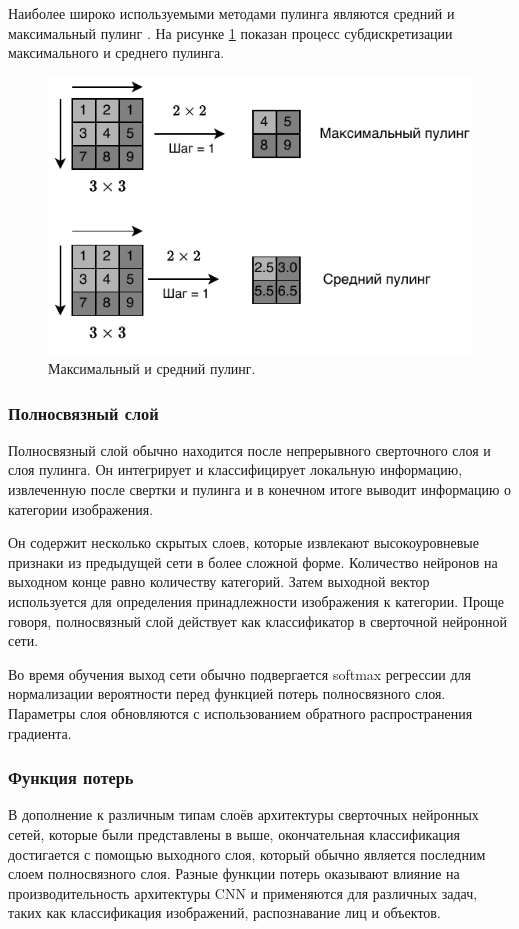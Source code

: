 Наиболее широко используемыми методами пулинга являются средний и максимальный пулинг \cite{pooling-layer-4}.
На рисунке \ref{fig:pooling-layer} показан процесс субдискретизации максимального и среднего пулинга.

\begin{figure}[hbtp]
	\centering
	\includegraphics[width=\textwidth]{img/pooling.pdf}
	\caption{Максимальный и средний пулинг.}
	\label{fig:pooling-layer}
\end{figure}

\clearpage


\subsubsection{Полносвязный слой}
Полносвязный  слой обычно находится после непрерывного сверточного слоя и слоя пулинга. Он интегрирует и классифицирует локальную информацию, извлеченную после свертки и пулинга и в конечном итоге выводит информацию о категории изображения. 

Он содержит несколько скрытых слоев, которые извлекают высокоуровневые признаки из предыдущей сети в более сложной форме. Количество нейронов на выходном конце равно количеству категорий. Затем выходной вектор используется для определения принадлежности изображения к категории. Проще говоря, полносвязный слой действует как классификатор в сверточной нейронной сети.

Во время обучения  выход сети обычно подвергается softmax регрессии\cite{pooling-layer-1} для нормализации вероятности перед функцией потерь полносвязного слоя. Параметры слоя обновляются с использованием обратного распространения градиента.

\subsubsection{Функция потерь}
В дополнение к различным типам слоёв архитектуры сверточных нейронных сетей, которые были представлены в выше, окончательная классификация достигается с помощью выходного слоя, который обычно является последним слоем полносвязного слоя. Разные функции потерь оказывают влияние на производительность архитектуры CNN и применяются для различных задач, таких как классификация изображений, распознавание лиц и объектов.

